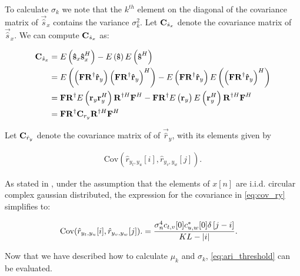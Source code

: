 \documentclass[a4paper, openany, oneside]{memoir}
\begin{document}
To calculate $\sigma_k$ we note that the $k^{th}$ element on the diagonal of the covariance matrix of $\vec{\hat{s}}_x$ contains the variance $\sigma_k^2$. Let $\boldsymbol{\mathbf{C}}_{\hat{s}_x}$ denote the covariance matrix of $\vec{\hat{s}}_x$.  We can compute $\boldsymbol{\mathbf{C}}_{\hat{s}_x}$ as:

\begin{align*}
\boldsymbol{\mathbf{C}}_{\hat{s}_x} &= E\left(\boldsymbol{\mathbf{\hat{s}}}_x\boldsymbol{\mathbf{\hat{s}}}_x^H\right) - E\left(\boldsymbol{\mathbf{\hat{s}}}\right)E\left(\boldsymbol{\mathbf{\hat{s}}}^H\right) \\
&= E\left(\left(\boldsymbol{\mathbf{F}} \boldsymbol{\mathbf{R}}^{\dagger}\boldsymbol{\mathbf{\hat{r}}}_y\right) \left( \boldsymbol{\mathbf{F}}\boldsymbol{\mathbf{R}}^{\dagger}\boldsymbol{\mathbf{\hat{r}}}_y\right)^H\right) - E\left(\boldsymbol{\mathbf{F}}\boldsymbol{\mathbf{R}}^{\dagger}\boldsymbol{\mathbf{\hat{r}}}_y\right)E\left(\left(\boldsymbol{\mathbf{F}}\boldsymbol{\mathbf{R}}^{\dagger}\boldsymbol{\mathbf{\hat{r}}}_y\right)^H\right) \\
&= \boldsymbol{\mathbf{F}}\boldsymbol{\mathbf{R}}^{\dagger} E\left(\boldsymbol{\mathbf{r}}_y\boldsymbol{\mathbf{r}}_y^H\right)  \boldsymbol{\mathbf{R}}^{\dagger H}\boldsymbol{\mathbf{F}}^H -  \boldsymbol{\mathbf{F}}\boldsymbol{\mathbf{R}}^{\dagger} E\left( \boldsymbol{\mathbf{r}}_y\right) E\left(\boldsymbol{\mathbf{r}}_y^H\right)  \boldsymbol{\mathbf{R}}^{\dagger H}\boldsymbol{\mathbf{F}}^H \\
&= \boldsymbol{\mathbf{F}}\boldsymbol{\mathbf{R}}^{\dagger} \boldsymbol{\mathbf{C}}_{r_y} \boldsymbol{\mathbf{R}}^{\dagger H}\boldsymbol{\mathbf{F}}^H
\end{align*}

Let $\boldsymbol{\mathbf{C}}_{\hat{r}_y}$ denote the covariance matrix of of $\vec{\hat{r}}_y$, with its elements given by

\begin{align}\label{eq:cov_ry}
\text{Cov}(\hat{r}_{y_t,y_u}[i],\hat{r}_{y_v, y_w}[j]).
\end{align}

As stated in \cite{ariananda2012compressive}, under the assumption that the elements of $x[n]$ are i.i.d. circular complex gaussian distributed, the expression for the covariance in \cref{eq:cov_ry} simplifies to:

\begin{align}\label{eq:elem_cov_ry}
\text{Cov}(\hat{r}_{y_t,y_u}[i],\hat{r}_{y_v, y_w}[j]). &= \frac{\sigma_n^4 c_{t,v}[0] c^*_{u,w}[0] \delta \left[ j-i\right]}{KL-|i|}.
\end{align}

Now that we have described how to calculate $\mu_k$ and $\sigma_k$, \cref{eq:ari_threshold} can be evaluated.

\end{document}

